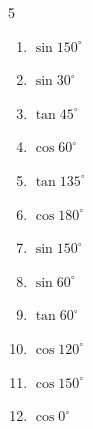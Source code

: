 \begin{multicols}{5}
\begin{enumerate}
        \phantom{$\displaystyle =0$}

  \item $\displaystyle \sin{150^\circ}$


  \item $\displaystyle \sin{30^\circ}$


  \item $\displaystyle \tan{45^\circ}$

        \phantom{$\displaystyle =1$}

  \item $\displaystyle \cos{60^\circ}$


  \item $\displaystyle \tan{135^\circ}$

        \phantom{$\displaystyle =-1$}

  \item $\displaystyle \cos{180^\circ}$

        \phantom{$\displaystyle =-1$}

  \item $\displaystyle \sin{150^\circ}$


\columnbreak %

  \item $\displaystyle \sin{60^\circ}$


  \item $\displaystyle \tan{60^\circ}$


  \item $\displaystyle \cos{120^\circ}$


  \item $\displaystyle \cos{150^\circ}$


  \item $\displaystyle \cos{0^\circ}$

        \phantom{$\displaystyle =1$}


\end{enumerate}
\end{multicols}
